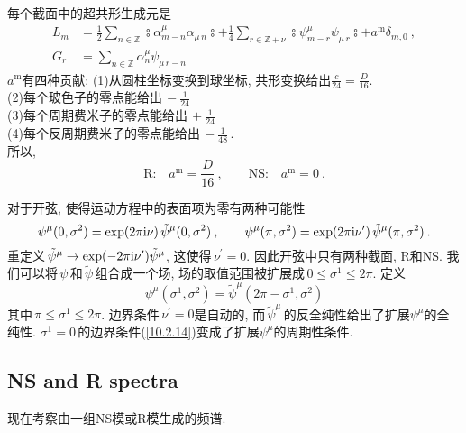 每个截面中的超共形生成元是
\begin{subequations}
\begin{align}
    L_{m}&=\frac{1}{2}\sum_{n\in\mathds{Z}} \typecolon \alpha_{m-n}^{\mu}\alpha_{\mu\,n}\!\typecolon
    +\frac{1}{4}\sum_{r\in\mathds{Z}+\nu}\typecolon\psi^{\mu}_{m-r}\psi_{\mu\,r}\!\typecolon+a^{\mathrm{m}}\delta_{m,0}\:, \label{10.2.12a} \\
    G_{r}&=\sum_{n\in\mathds{Z}}\alpha_{n}^{\mu}\psi_{\mu\,r-n} \label{10.2.12b}
\end{align}
\end{subequations}
$a^{\mathrm{m}}$有四种贡献:
(1)从圆柱坐标变换到球坐标, 共形变换给出$\frac{c}{24}=\frac{D}{16}$. \\
(2)每个玻色子的零点能给出$\,-\frac{1}{24}\,$ \\
(3)每个周期费米子的零点能给出$\,+\frac{1}{24}\,$ \\
(4)每个反周期费米子的零点能给出$\,-\frac{1}{48}\,$. \\
所以,
\begin{equation}
    \text{R:}\quad a^{\mathrm{m}}=\frac{D}{16}\:,\qquad
    \text{NS:}\quad a^{\mathrm{m}}=0 \:. \label{10.2.13}
\end{equation}

对于开弦, 使得运动方程中的表面项为零有两种可能性
\begin{equation}
    \psi^{\mu}(0,\sigma^{2})=\exp(2\pi\mathrm{i}\nu)\,\tilde{\psi}^{\mu}(0,\sigma^{2}) \:, \qquad
    \psi^{\mu}(\pi,\sigma^{2})=\exp(2\pi\mathrm{i}\nu^{\prime})\,\tilde{\psi}^{\mu}(\pi,\sigma^{2}) \:. \label{10.2.14} 
\end{equation}
重定义$\,\tilde{\psi}^{\mu}\to\exp(-2\pi\mathrm{i}\nu^{\prime})\tilde{\psi}^{\mu}$, 这使得$\,\nu^{\prime}=0$. 因此开弦中只有两种截面, R和NS. 我们可以将$\,\psi\,$和$\,\tilde{\psi}\,$组合成一个场, 场的取值范围被扩展成$\,0\leq\sigma^{1}\leq 2\pi$. 定义
\begin{equation}
    \psi^{\mu}(\sigma^{1},\sigma^{2})=\tilde{\psi}^{\mu}(2\pi-\sigma^{1},\sigma^{2})\label{10.2.15} 
\end{equation}
其中$\,\pi\leq\sigma^{1}\leq 2\pi$. 边界条件$\,\nu^{\prime}=0$是自动的, 而$\,\tilde{\psi}^{\mu}\,$的反全纯性给出了扩展$\psi^{\mu}$的全纯性. $\sigma^{1}=0\,$的边界条件(\ref{10.2.14})变成了扩展$\psi^{\mu}$的周期性条件.

\subsection*{NS and R spectra}
现在考察由一组NS模或R模生成的频谱. 

